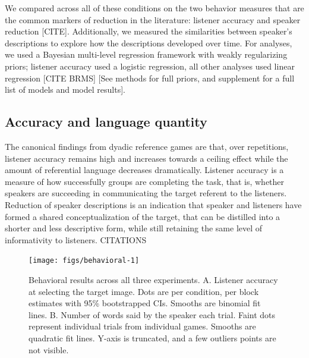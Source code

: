 \documentclass[
  english,
  a4paper,
]{article}
\begin{document}
We compared across all of these conditions on the two behavior measures that are the common markers of reduction in the literature: listener accuracy and speaker reduction {[}CITE{]}. Additionally, we measured the similarities between speaker's descriptions to explore how the descriptions developed over time. For analyses, we used a Bayesian multi-level regression framework with weakly regularizing priors; listener accuracy used a logistic regression, all other analyses used linear regression {[}CITE BRMS{]} {[}See methods for full priors, and supplement for a full list of models and model results{]}.

\hypertarget{accuracy-and-language-quantity}{%
\subsection{Accuracy and language quantity}\label{accuracy-and-language-quantity}}

The canonical findings from dyadic reference games are that, over repetitions, listener accuracy remains high and increases towards a ceiling effect while the amount of referential language decreases dramatically. Listener accuracy is a measure of how successfully groups are completing the task, that is, whether speakers are succeeding in communicating the target referent to the listeners. Reduction of speaker descriptions is an indication that speaker and listeners have formed a shared conceptualization of the target, that can be distilled into a shorter and less descriptive form, while still retaining the same level of informativity to listeners. CITATIONS

\begin{figure}[t!]

{\centering \texttt{[image: figs/behavioral-1]} 

}

\caption{Behavioral results across all three experiments. A. Listener accuracy at selecting the target image. Dots are per condition, per block estimates with 95\% bootstrapped CIs. Smooths are binomial fit lines. B. Number of words said by the speaker each trial. Faint dots represent individual trials from individual games. Smooths are quadratic fit lines. Y-axis is truncated, and a few outliers points are not visible. }\label{fig:behavioral}
\end{figure}
\end{document}
